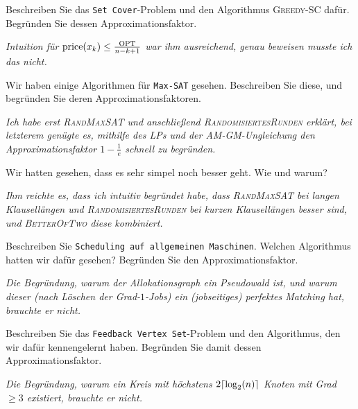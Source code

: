 \documentclass[language=ngerman]{TemplateExercise}
\begin{document}
\begin{abstract}
    \noindent Die Prüfung bei Prof. Röglin und seinem Assistenten dauerte ca. 25 Minuten bei sehr angenehmer Atmosphäre. Zettel und Stift lagen aus und konnten genutzt werden.
\end{abstract}

\begin{problem}%
    Beschreiben Sie das \verb|Set Cover|-Problem und den Algorithmus \textsc{Greedy-SC} dafür. Begründen Sie dessen Approximationsfaktor.

    \emph{Intuition für $\mathrm{price}(x_k) \leq \frac{\operatorname{OPT}}{n-k+1}$ war ihm ausreichend, genau beweisen musste ich das nicht.}
\end{problem}

\begin{problem}%
    Wir haben einige Algorithmen für \verb|Max-SAT| gesehen. Beschreiben Sie diese, und begründen Sie deren Approximationsfaktoren. 
    
    \emph{Ich habe erst \textsc{RandMaxSAT} und anschließend \textsc{RandomisiertesRunden} erklärt, bei letzterem genügte es, mithilfe des LPs und der AM-GM-Ungleichung den Approximationsfaktor $1 - \frac{1}{e}$ schnell zu begründen.}
\end{problem}

\begin{problem}%
    Wir hatten gesehen, dass es sehr simpel noch besser geht. Wie und warum? 
    
    \emph{Ihm reichte es, dass ich intuitiv begründet habe, dass \textsc{RandMaxSAT} bei langen Klausellängen und \textsc{RandomisiertesRunden} bei kurzen Klausellängen besser sind, und \textsc{BetterOfTwo} diese kombiniert.}
\end{problem}

\begin{problem}%
    Beschreiben Sie \verb|Scheduling auf allgemeinen Maschinen|. Welchen Algorithmus hatten wir dafür gesehen? Begründen Sie den Approximationsfaktor. 
    
    \emph{Die Begründung, warum der Allokationsgraph ein Pseudowald ist, und warum dieser (nach Löschen der Grad-$1$-Jobs) ein (jobseitiges) perfektes Matching hat, brauchte er nicht.}
\end{problem}

\begin{problem}%
    Beschreiben Sie das \verb|Feedback Vertex Set|-Problem und den Algorithmus, den wir dafür kennengelernt haben. Begründen Sie damit dessen Approximationsfaktor. 
    
    \emph{Die Begründung, warum ein Kreis mit höchstens $2\ceil*{\log_2(n)}$ Knoten mit Grad $\geq 3$ existiert, brauchte er nicht.}
\end{problem}
\end{document}
